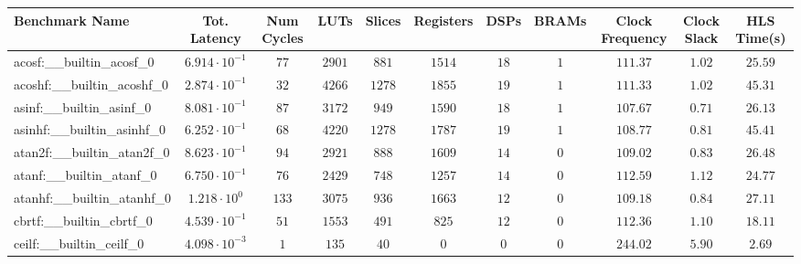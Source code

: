 \begin{tabular}{|l|c|c|c|c|c|c|c|c|c|c|}
\hline
Benchmark Name                            & Tot. Latency            & Num Cycles & LUTs      & Slices    & Registers & DSPs    & BRAMs & Clock Frequency & Clock Slack & HLS Time(s) \\
\hline
acosf:\_\_builtin\_acosf\_0               & $ 6.914 \cdot 10^{-1} $ & $ 77     $ & $ 2901  $ & $ 881   $ & $ 1514  $ & $ 18  $ & $ 1 $ & $ 111.37      $ & $ 1.02    $ & $ 25.59   $ \\
acoshf:\_\_builtin\_acoshf\_0             & $ 2.874 \cdot 10^{-1} $ & $ 32     $ & $ 4266  $ & $ 1278  $ & $ 1855  $ & $ 19  $ & $ 1 $ & $ 111.33      $ & $ 1.02    $ & $ 45.31   $ \\
asinf:\_\_builtin\_asinf\_0               & $ 8.081 \cdot 10^{-1} $ & $ 87     $ & $ 3172  $ & $ 949   $ & $ 1590  $ & $ 18  $ & $ 1 $ & $ 107.67      $ & $ 0.71    $ & $ 26.13   $ \\
asinhf:\_\_builtin\_asinhf\_0             & $ 6.252 \cdot 10^{-1} $ & $ 68     $ & $ 4220  $ & $ 1278  $ & $ 1787  $ & $ 19  $ & $ 1 $ & $ 108.77      $ & $ 0.81    $ & $ 45.41   $ \\
atan2f:\_\_builtin\_atan2f\_0             & $ 8.623 \cdot 10^{-1} $ & $ 94     $ & $ 2921  $ & $ 888   $ & $ 1609  $ & $ 14  $ & $ 0 $ & $ 109.02      $ & $ 0.83    $ & $ 26.48   $ \\
atanf:\_\_builtin\_atanf\_0               & $ 6.750 \cdot 10^{-1} $ & $ 76     $ & $ 2429  $ & $ 748   $ & $ 1257  $ & $ 14  $ & $ 0 $ & $ 112.59      $ & $ 1.12    $ & $ 24.77   $ \\
atanhf:\_\_builtin\_atanhf\_0             & $ 1.218 \cdot 10^{0}  $ & $ 133    $ & $ 3075  $ & $ 936   $ & $ 1663  $ & $ 12  $ & $ 0 $ & $ 109.18      $ & $ 0.84    $ & $ 27.11   $ \\
cbrtf:\_\_builtin\_cbrtf\_0               & $ 4.539 \cdot 10^{-1} $ & $ 51     $ & $ 1553  $ & $ 491   $ & $ 825   $ & $ 12  $ & $ 0 $ & $ 112.36      $ & $ 1.10    $ & $ 18.11   $ \\
ceilf:\_\_builtin\_ceilf\_0               & $ 4.098 \cdot 10^{-3} $ & $ 1      $ & $ 135   $ & $ 40    $ & $ 0     $ & $ 0   $ & $ 0 $ & $ 244.02      $ & $ 5.90    $ & $ 2.69    $ \\

\end{tabular}
